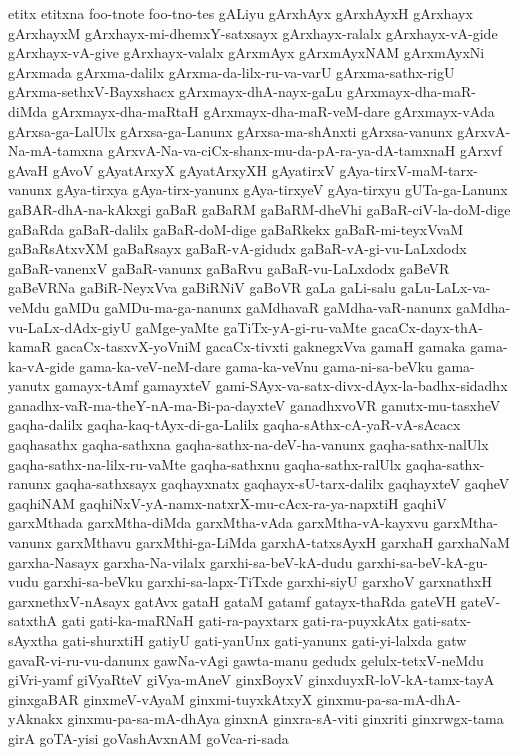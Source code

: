 {etitx
etitxna
foo-tnote
foo-tno-tes
gALiyu
gArxhAyx
gArxhAyxH
gArxhayx
gArxhayxM
gArxhayx-mi-dhemxY-satxsayx
gArxhayx-ralalx
gArxhayx-vA-gide
gArxhayx-vA-give
gArxhayx-valalx
gArxmAyx
gArxmAyxNAM
gArxmAyxNi
gArxmada
gArxma-dalilx
gArxma-da-lilx-ru-va-varU
gArxma-sathx-rigU
gArxma-sethxV-Bayxshacx
gArxmayx-dhA-nayx-gaLu
gArxmayx-dha-maR-diMda
gArxmayx-dha-maRtaH
gArxmayx-dha-maR-veM-dare
gArxmayx-vAda
gArxsa-ga-LalUlx
gArxsa-ga-Lanunx
gArxsa-ma-shAnxti
gArxsa-vanunx
gArxvA-Na-mA-tamxna
gArxvA-Na-va-ciCx-shanx-mu-da-pA-ra-ya-dA-tamxnaH
gArxvf
gAvaH
gAvoV
gAyatArxyX
gAyatArxyXH
gAyatirxV
gAya-tirxV-maM-tarx-vanunx
gAya-tirxya
gAya-tirx-yanunx
gAya-tirxyeV
gAya-tirxyu
gUTa-ga-Lanunx
gaBAR-dhA-na-kAkxgi
gaBaR
gaBaRM
gaBaRM-dheVhi
gaBaR-ciV-la-doM-dige
gaBaRda
gaBaR-dalilx
gaBaR-doM-dige
gaBaRkekx
gaBaR-mi-teyxVvaM
gaBaRsAtxvXM
gaBaRsayx
gaBaR-vA-gidudx
gaBaR-vA-gi-vu-LaLxdodx
gaBaR-vanenxV
gaBaR-vanunx
gaBaRvu
gaBaR-vu-LaLxdodx
gaBeVR
gaBeVRNa
gaBiR-NeyxVva
gaBiRNiV
gaBoVR
gaLa
gaLi-salu
gaLu-LaLx-va-veMdu
gaMDu
gaMDu-ma-ga-nanunx
gaMdhavaR
gaMdha-vaR-nanunx
gaMdha-vu-LaLx-dAdx-giyU
gaMge-yaMte
gaTiTx-yA-gi-ru-vaMte
gacaCx-dayx-thA-kamaR
gacaCx-tasxvX-yoVniM
gacaCx-tivxti
gaknegxVva
gamaH
gamaka
gama-ka-vA-gide
gama-ka-veV-neM-dare
gama-ka-veVnu
gama-ni-sa-beVku
gama-yanutx
gamayx-tAmf
gamayxteV
gami-SAyx-va-satx-divx-dAyx-la-badhx-sidadhx
ganadhx-vaR-ma-theY-nA-ma-Bi-pa-dayxteV
ganadhxvoVR
ganutx-mu-tasxheV
gaqha-dalilx
gaqha-kaq-tAyx-di-ga-Lalilx
gaqha-sAthx-cA-yaR-vA-sAcacx
gaqhasathx
gaqha-sathxna
gaqha-sathx-na-deV-ha-vanunx
gaqha-sathx-nalUlx
gaqha-sathx-na-lilx-ru-vaMte
gaqha-sathxnu
gaqha-sathx-ralUlx
gaqha-sathx-ranunx
gaqha-sathxsayx
gaqhayxnatx
gaqhayx-sU-tarx-dalilx
gaqhayxteV
gaqheV
gaqhiNAM
gaqhiNxV-yA-namx-natxrX-mu-cAcx-ra-ya-napxtiH
gaqhiV
garxMthada
garxMtha-diMda
garxMtha-vAda
garxMtha-vA-kayxvu
garxMtha-vanunx
garxMthavu
garxMthi-ga-LiMda
garxhA-tatxsAyxH
garxhaH
garxhaNaM
garxha-Nasayx
garxha-Na-vilalx
garxhi-sa-beV-kA-dudu
garxhi-sa-beV-kA-gu-vudu
garxhi-sa-beVku
garxhi-sa-lapx-TiTxde
garxhi-siyU
garxhoV
garxnathxH
garxnethxV-nAsayx
gatAvx
gataH
gataM
gatamf
gatayx-thaRda
gateVH
gateV-satxthA
gati
gati-ka-maRNaH
gati-ra-payxtarx
gati-ra-puyxkAtx
gati-satx-sAyxtha
gati-shurxtiH
gatiyU
gati-yanUnx
gati-yanunx
gati-yi-lalxda
gatw
gavaR-vi-ru-vu-danunx
gawNa-vAgi
gawta-manu
gedudx
gelulx-tetxV-neMdu
giVri-yamf
giVyaRteV
giVya-mAneV
ginxBoyxV
ginxduyxR-loV-kA-tamx-tayA
ginxgaBAR
ginxmeV-vAyaM
ginxmi-tuyxkAtxyX
ginxmu-pa-sa-mA-dhA-yAknakx
ginxmu-pa-sa-mA-dhAya
ginxnA
ginxra-sA-viti
ginxriti
ginxrwgx-tama
girA
goTA-yisi
goVashAvxnAM
goVca-ri-sada
}
